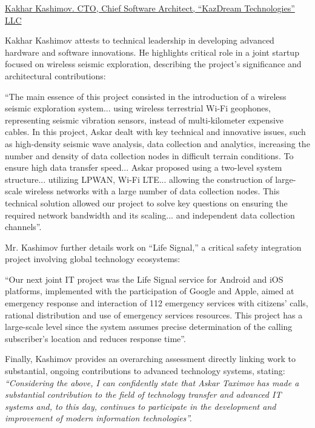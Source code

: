 \bigskip
\noindent\underline{Kakhar Kashimov. CTO, Chief Software Architect, ``KazDream Technologies'' LLC}

Kakhar Kashimov attests to \mrls technical leadership in developing advanced hardware and software innovations. He highlights \mrls critical role in a joint startup focused on wireless seismic exploration, describing the project’s significance and \mrls architectural contributions:
\begin{fullquote}
``The main essence of this project consisted in the introduction of a wireless seismic exploration system... using wireless terrestrial Wi-Fi geophones, representing seismic vibration sensors, instead of multi-kilometer expensive cables. In this project, Askar dealt with key technical and innovative issues, such as high-density seismic wave analysis, data collection and analytics, increasing the number and density of data collection nodes in difficult terrain conditions. To ensure high data transfer speed... Askar proposed using a two-level system structure... utilizing LPWAN, Wi-Fi LTE... allowing the construction of large-scale wireless networks with a large number of data collection nodes. This technical solution allowed our project to solve key questions on ensuring the required network bandwidth and its scaling... and independent data collection channels''.
\end{fullquote}

Mr. Kashimov further details \mrls work on ``Life Signal,'' a critical safety integration project involving global technology ecosystems:
\begin{fullquote}
``Our next joint IT project was the Life Signal service for Android and iOS platforms, implemented with the participation of Google and Apple, aimed at emergency response and interaction of 112 emergency services with citizens' calls, rational distribution and use of emergency services resources. This project has a large-scale level since the system assumes precise determination of the calling subscriber's location and reduces response time''.
\end{fullquote}

Finally, Kashimov provides an overarching assessment directly linking \mrls work to substantial, ongoing contributions to advanced technology systems, stating:
\emph{``Considering the above, I can confidently state that Askar Taximov has made a substantial contribution to the field of technology transfer and advanced IT systems and, to this day, continues to participate in the development and improvement of modern information technologies''.}  



